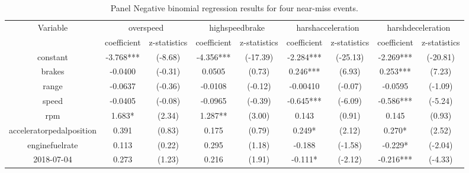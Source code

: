 \documentclass[entropy,article,submit,moreauthors,LaTeX and dvi2pdf]{Definitions/mdpi}
\begin{document}
\begin{center}
\begin{longtable}{ccccccccc}
\caption{Panel Negative binomial regression results for four near-miss events.}
\label{panel-nb}\\
\toprule
\multicolumn{1}{c}{\multirow{2}{*}{Variable}} & \multicolumn{2}{c}{overspeed} & \multicolumn{2}{c}{highspeedbrake} & \multicolumn{2}{c}{harshacceleration} & \multicolumn{2}{c}{harshdeceleration} \\
\multicolumn{1}{c}{}                          & coefficient   & z-statistics  & coefficient     & z-statistics     & coefficient       & z-statistics      & coefficient       & z-statistics      \\
\midrule
constant                                         & -3.768***     & (-8.68)       & -4.356***       & (-17.39)         & -2.284***         & (-25.13)          & -2.269***         & (-20.81)          \\
brakes                                        & -0.0400       & (-0.31)       & 0.0505          & (0.73)           & 0.246***          & (6.93)            & 0.253***          & (7.23)            \\
range                                         & -0.0637       & (-0.36)       & -0.0108         & (-0.12)          & -0.00410          & (-0.07)           & -0.0595           & (-1.09)           \\
speed                                         & -0.0405       & (-0.08)       & -0.0965         & (-0.39)          & -0.645***         & (-6.09)           & -0.586***         & (-5.24)           \\
rpm                                           & 1.683*        & (2.34)        & 1.287**         & (3.00)           & 0.143             & (0.91)            & 0.145             & (0.93)            \\
acceleratorpedalposition                      & 0.391         & (0.83)        & 0.175           & (0.79)           & 0.249*            & (2.12)            & 0.270*            & (2.52)            \\
enginefuelrate                                & 0.113         & (0.22)        & 0.295           & (1.18)           & -0.188            & (-1.58)           & -0.229*           & (-2.04)           \\
2018-07-04                                    & 0.273         & (1.23)        & 0.216           & (1.91)           & -0.111*           & (-2.12)           & -0.216***         & (-4.33)           \\

\end{longtable}
\end{center}
\end{document}
